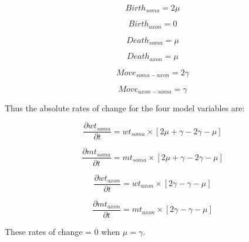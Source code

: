 \documentclass[]{article}
\begin{document}
		\begin{equation}
		Birth_{soma} = 2\mu
	\end{equation}
	
	\begin{equation}
		Birth_{axon} = 0
	\end{equation}
	
	\begin{equation}
		Death_{soma} = \mu
	\end{equation}
	
	\begin{equation}
		Death_{axon} = \mu
	\end{equation}
		
	\begin{equation}
		Move_{soma-axon} = 2\gamma
	\end{equation}
	
	\begin{equation}
		Move_{axon-soma} = \gamma
	\end{equation}

	Thus the absolute rates of change for the four model variables are:
	
	\begin{equation}
		\frac{\partial wt_{soma}}{\partial t} = wt_{soma} \times [ 2\mu + \gamma - 2\gamma - \mu ]
	\end{equation}

	\begin{equation}
		\frac{\partial mt_{soma}}{\partial t} = mt_{soma} \times [ 2\mu + \gamma - 2\gamma - \mu ]
	\end{equation}

	\begin{equation}
		\frac{\partial wt_{axon}}{\partial t} = wt_{axon} \times [ 2\gamma - \gamma - \mu ]
	\end{equation}
	
	\begin{equation}
		\frac{\partial mt_{axon}}{\partial t} = mt_{axon} \times [ 2\gamma - \gamma - \mu ]
	\end{equation}
	
	These rates of change = 0 when $\mu = \gamma$.
	
\end{document}
